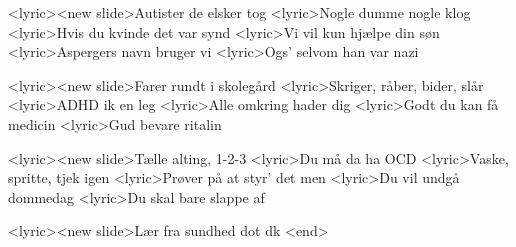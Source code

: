<lyric><new slide>Autister de elsker tog
<lyric>Nogle dumme nogle klog
<lyric>Hvis du kvinde det var synd
<lyric>Vi vil kun hjælpe din søn
<lyric>Aspergers navn bruger vi
<lyric>Ogs’ selvom han var nazi

<lyric><new slide>Farer rundt i skolegård
<lyric>Skriger, råber, bider, slår
<lyric>ADHD ik en leg
<lyric>Alle omkring hader dig
<lyric>Godt du kan få medicin
<lyric>Gud bevare ritalin

<lyric><new slide>Tælle alting, 1-2-3
<lyric>Du må da ha OCD
<lyric>Vaske, spritte, tjek igen
<lyric>Prøver på at styr’ det men
<lyric>Du vil undgå dommedag
<lyric>Du skal bare slappe af

<lyric><new slide>Lær fra sundhed dot dk
<end>
